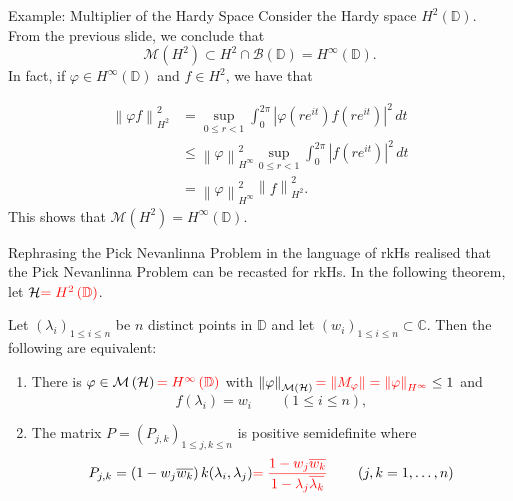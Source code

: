 \documentclass{beamer}
\newcommand{\C}{\mathbb C}
\newcommand{\D}{\mathbb D}
\newcommand{\calB}{{\mathcal B}}
\newcommand{\calH}{{\mathcal H}}
\newcommand{\calM}{{\mathcal M}}
\newcommand{\norm}[1]{\left\lVert #1 \right\rVert}
\newcommand{\abs}[1]{\left\lvert #1 \right\rvert}
\begin{document}
\begin{frame}{Example: Multiplier of the Hardy Space}
Consider the Hardy space $H^{2} \left( \D \right)$. From the previous slide, we conclude that 
\begin{equation*}
\calM \left( H^{2} \right) \subset H^{2} \cap \calB \left( \D \right) = H^{\infty} \left( \D \right).
\end{equation*}
\pause
In fact, if $\varphi \in H^{\infty} \left( \D \right)$ and $f \in H^{2}$, we have that 

\begin{align*}
\norm{\varphi f}_{H^{2}}^{2} &= \sup_{0\le r < 1} \int_{0}^{2\pi} \abs{\varphi \left( re^{it} \right) f \left( re^{it} \right)}^{2} \, dt \\
&\le \norm{\varphi}_{H^{\infty}}^{2} \sup_{0 \le r < 1} \int_{0}^{2\pi} \abs{f\left( re^{it} \right)}^{2} \, dt \\
&= \norm{\varphi}_{H^{\infty}}^{2} \norm{f}_{H^{2}}^{2}.
\end{align*}
This shows that $\calM \left( H^{2} \right) = H^{\infty} \left( \D \right)$.
\end{frame}

\begin{frame}{Rephrasing the Pick Nevanlinna Problem in the language of rkHs}
\citeauthor{1cb1f5bb-aa4a-31e2-ba77-0159c6d327f4} \cite{1cb1f5bb-aa4a-31e2-ba77-0159c6d327f4} realised that the Pick Nevanlinna Problem can be recasted for rkHs. In the following theorem, let $\calH \textcolor{red}{= H^{2} \left( \D \right)}$.
\begin{theorem}
Let $\left( \lambda_{i} \right)_{1\le i \le n}$ be $n$ distinct points in $\D$ and let $\left( w_{i} \right)_{1 \le i \le n} \subset \C$. Then the following are equivalent:
\begin{enumerate}
\item There is $\varphi \in \calM \left( \calH \right) \textcolor{red}{= H^{\infty} \left( \D \right)}$ with $\norm{\varphi}_{\calM \left( \calH \right)} \textcolor{red}{=\norm{M_{\varphi}} = \norm{\varphi}_{H^{\infty}}}\le 1$ and 
\begin{equation*}
f\left( \lambda_{i} \right) = w_{i} \qquad \left( 1 \le i \le n \right),
\end{equation*}
\item The matrix $P = \left( P_{j,k} \right)_{1 \le j,k \le n}$ is positive semidefinite where
\begin{equation*}
P_{j,k} = \left( 1-w_{j}\overline{w_{k}} \right) k(\lambda_{i}, \lambda_{j})  \textcolor{red}{=\frac{1-w_{j} \overline{w_{k}}}{1-\lambda_{j}\overline{\lambda_{k}}}} \qquad \left( j,k = 1, \ldots , n \right)
\end{equation*}
\end{enumerate}
\end{theorem}
\end{frame}
\end{document}
